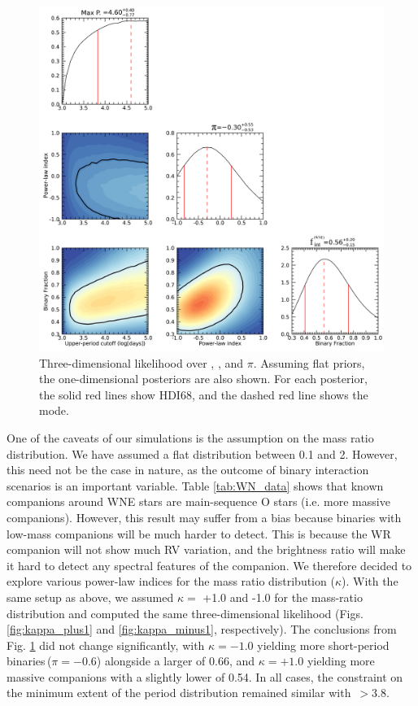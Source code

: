 \begin{figure}[ht]
    \centering
    \includegraphics[width=\textwidth]{chapters/WNE/image/WN_AUG30_FPmaxPL_Qmax2_HighRes2_Posterior.png}
    \caption{Three-dimensional likelihood over \logPmax{}, \fintWNE{} , and $\pi$. Assuming flat priors, the one-dimensional posteriors are also shown. For each posterior, the solid red lines show HDI68, and the dashed red line shows the mode.}
    \label{fig:flat_pdist_binfrac}
\end{figure}

One of the caveats of our simulations is the assumption on the mass ratio distribution. We have assumed a flat distribution between 0.1 and 2. However, this need not be the case in nature, as the outcome of binary interaction scenarios is an important variable. Table \ref{tab:WN_data} shows that known companions around WNE stars are main-sequence O stars (i.e. more massive companions). However, this result may suffer from a bias because binaries with low-mass companions will be much harder to detect. This is because the WR companion will not show much RV variation, and the brightness ratio will make it hard to detect any spectral features of the companion. We therefore decided to explore various power-law indices for the mass ratio distribution ($\kappa$). With the same setup as above, we assumed $\kappa =$ +1.0 and -1.0 for the mass-ratio distribution and computed the same three-dimensional likelihood (Figs. \ref{fig:kappa_plus1} and \ref{fig:kappa_minus1}, respectively). The conclusions from Fig. \ref{fig:flat_pdist_binfrac} did not change significantly, with $\kappa = -1.0$ yielding more short-period binaries\,($\pi = -0.6$) alongside a larger \fintWNE{} of 0.66, and $\kappa = +1.0$ yielding more massive companions with a slightly lower \fintWNE{} of 0.54. In all cases, the constraint on the minimum extent of the period distribution remained similar with \logPmax{}\,$> 3.8$.

